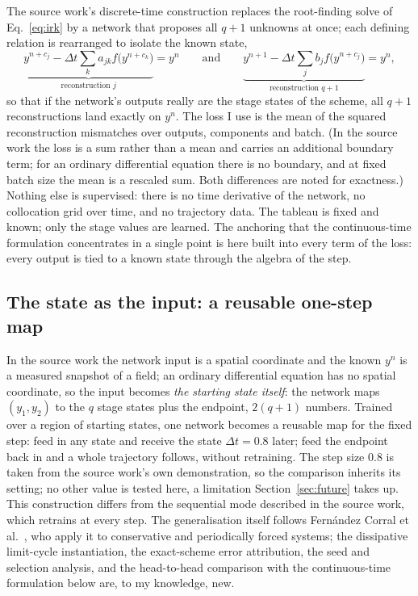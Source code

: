 \documentclass[11pt,a4paper]{article}
\begin{document}
The source work's discrete-time construction replaces the root-finding
solve of Eq.~\eqref{eq:irk} by a network that proposes all $q+1$ unknowns
at once; each defining relation is rearranged to isolate the known state,
\begin{equation}
  \underbrace{y^{n+c_j} - \Delta t \sum_k a_{jk} f\big(y^{n+c_k}\big)}_{\text{reconstruction } j} = y^n
  \qquad\text{and}\qquad
  \underbrace{y^{n+1} - \Delta t \sum_j b_j f\big(y^{n+c_j}\big)}_{\text{reconstruction } q+1} = y^n ,
  \label{eq:recon}
\end{equation}
so that if the network's outputs really are the stage states of the scheme,
all $q+1$ reconstructions land exactly on $y^n$. The loss I use is the
mean of the squared reconstruction mismatches over outputs, components and
batch.
(In the source work the loss is a sum rather than a mean and carries an
additional boundary term; for an ordinary differential equation there is no
boundary, and at fixed batch size the mean is a rescaled sum. Both
differences are noted for exactness.) Nothing else is supervised: there is
no time derivative of the network, no collocation grid over time, and no
trajectory data. The tableau is fixed and known; only the stage values are
learned. The anchoring that the continuous-time formulation concentrates
in a single point is here built into every term of the loss: every output
is tied to a known state through the algebra of the step.

\subsection{The state as the input: a reusable one-step map}

In the source work the network input is a spatial coordinate and the known
$y^n$ is a measured snapshot of a field; an ordinary differential equation
has no spatial coordinate, so the input becomes \emph{the starting state
itself}: the network maps $(y_1, y_2)$ to the $q$ stage states plus the
endpoint, $2(q+1)$ numbers. Trained over a region of starting states, one
network becomes a reusable map for the fixed step: feed in any state
and receive the state $\Delta t = 0.8$ later; feed the endpoint back in
and a whole trajectory follows, without retraining. The step size 0.8 is
taken from the source work's own demonstration, so the comparison
inherits its setting; no other value is tested here, a limitation
Section~\ref{sec:future} takes up. This construction differs from the
sequential mode described in the source work, which retrains at every
step. The generalisation itself follows Fern\'andez Corral et
al.~\cite{fernandez2024}, who apply it to conservative and periodically
forced systems; the dissipative limit-cycle instantiation, the
exact-scheme error attribution, the seed and selection analysis, and the
head-to-head comparison with the continuous-time formulation below are, to
my knowledge, new.
\end{document}
